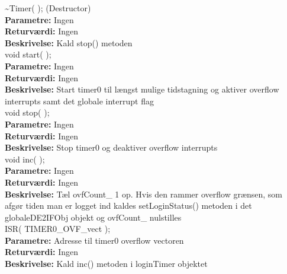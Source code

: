 \textasciitilde Timer( ); (Destructor) \\
\textbf{Parametre:} Ingen \\
\textbf{Returværdi:} Ingen \\
\textbf{Beskrivelse:} Kald stop() metoden \\

void start( ); \\
\textbf{Parametre:} Ingen \\
\textbf{Returværdi:} Ingen \\
\textbf{Beskrivelse:} Start timer0 til længst mulige tidstagning og aktiver overflow interrupts samt det globale interrupt flag \\

void stop( ); \\
\textbf{Parametre:} Ingen \\
\textbf{Returværdi:} Ingen \\
\textbf{Beskrivelse:} Stop timer0 og deaktiver overflow interrupts \\

void inc( ); \\
\textbf{Parametre:} Ingen \\
\textbf{Returværdi:} Ingen \\
\textbf{Beskrivelse:} Tæl ovfCount\_ 1 op. Hvis den rammer overflow grænsen, som afgør tiden man er logget ind kaldes setLoginStatus() metoden i det globaleDE2IFObj objekt og ovfCount\_ nulstilles  \\

ISR( TIMER0\_OVF\_vect ); \\
\textbf{Parametre:} Adresse til timer0 overflow vectoren \\
\textbf{Returværdi:} Ingen \\
\textbf{Beskrivelse:} Kald inc() metoden i loginTimer objektet \\




